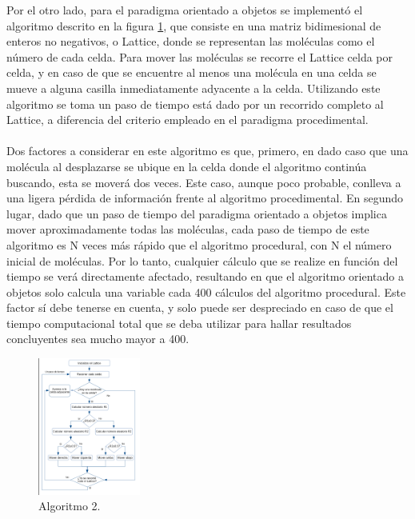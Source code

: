 \documentclass[12pt,twocolumn]{article}
\begin{document}
Por el otro lado, para el paradigma orientado a objetos se implementó el algoritmo descrito 
en la figura \ref{fig:algoritmo_OOP}, que consiste en una matriz bidimesional de enteros no 
negativos, o Lattice, donde se representan las moléculas como el número de cada celda. Para 
mover las moléculas se recorre el Lattice celda por celda, y en caso de que se encuentre al 
menos una molécula en una celda se mueve a alguna casilla inmediatamente adyacente a la celda. 
Utilizando este algoritmo se toma un paso de tiempo está dado por un recorrido completo al 
Lattice, a diferencia del criterio empleado en el paradigma procedimental. 
\\ \\
Dos factores a considerar en este algoritmo es que, primero, en dado caso que una molécula 
al desplazarse se ubique en la celda donde el algoritmo continúa buscando, esta se moverá 
dos veces. Este caso, aunque poco probable, conlleva a una ligera pérdida de información 
frente al algoritmo procedimental. En segundo lugar, dado que un paso de tiempo del paradigma 
orientado a objetos implica mover aproximadamente todas las moléculas, cada paso de tiempo 
de este algoritmo es N veces más rápido que el algoritmo procedural, con N el número inicial 
de moléculas. Por lo tanto, cualquier cálculo que se realize en función del tiempo se verá 
directamente afectado, resultando en que el algoritmo orientado a objetos solo calcula una 
variable cada 400 cálculos del algoritmo procedural. Este factor sí debe tenerse en cuenta, y 
solo puede ser despreciado en caso de que el tiempo computacional total que se deba utilizar 
para hallar resultados concluyentes sea mucho mayor a 400.



\begin{figure}
    \centering
    \includegraphics[width=0.3\textwidth]{figs/Algoritmo_OOP.png}
    \caption{Algoritmo 2.}
    \label{fig:algoritmo_OOP}
\end{figure}
\end{document}

